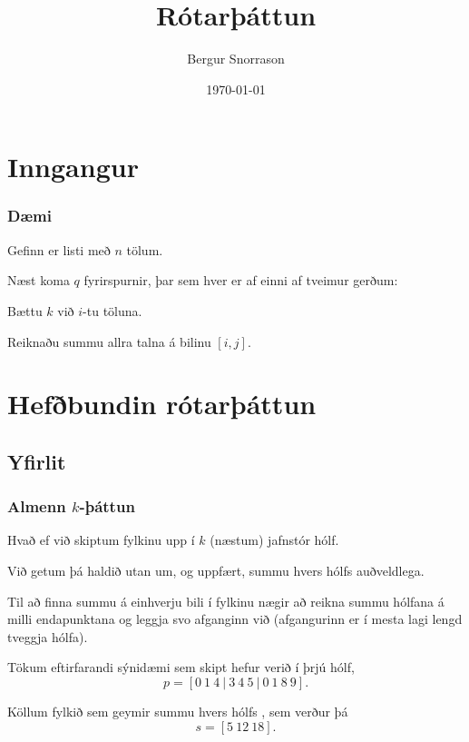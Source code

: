\title{Rótarþáttun}
\author{Bergur Snorrason}
\date{\today}



\frame{\titlepage}

\section{Inngangur}
{
	\frametitle{Dæmi}
	{
		\item<1-> Gefinn er listi með $n$ tölum.
		\item<2-> Næst koma $q$ fyrirspurnir, þar sem hver er af einni af tveimur gerðum:
		{
			\item<3-> Bættu $k$ við $i$-tu töluna.
			\item<4-> Reiknaðu summu allra talna á bilinu $[i, j]$.
		}
	}
}

\section{Hefðbundin rótarþáttun}
\subsection{Yfirlit}
{
	\frametitle{Almenn $k$-þáttun}
	{
		\item<1-> Hvað ef við skiptum fylkinu upp í $k$ (næstum) jafnstór hólf.
		\item<2-> Við getum þá haldið utan um, og uppfært, summu hvers hólfs auðveldlega.
		\item<3-> Til að finna summu á einhverju bili í fylkinu nægir að reikna summu hólfana á milli
			endapunktana og leggja svo afganginn við (afgangurinn er í mesta lagi lengd tveggja hólfa).
		\item<4-> Tökum eftirfarandi sýnidæmi sem skipt hefur verið í þrjú hólf,
			\[
				p = [0\ 1\ 4\ |\ 3\ 4\ 5\ |\ 0\ 1\ 8\ 9].
			\]
		\item<5-> Köllum fylkið sem geymir summu hvers hólfs , sem verður þá
			\[
				s = [5\ 12\ 18].
			\]
	}
}


